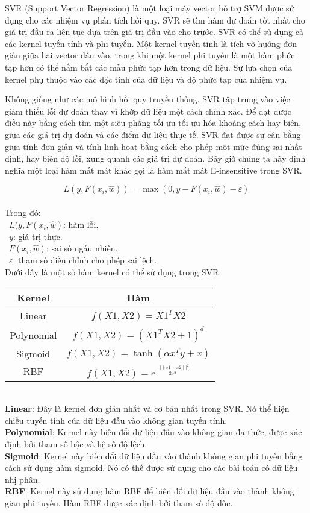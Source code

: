 SVR (Support Vector Regression) là một loại máy vector hỗ trợ SVM được sử dụng cho các nhiệm vụ phân tích hồi quy. SVR sẽ tìm hàm dự đoán tốt nhất cho giá trị đầu ra liên tục dựa trên giá trị đầu vào cho trước. SVR có thể sử dụng cả các kernel tuyến tính và phi tuyến. Một kernel tuyến tính là tích vô hướng đơn giản giữa hai vector đầu vào, trong khi một kernel phi tuyến là một hàm phức tạp hơn có thể nắm bắt các mẫu phức tạp hơn trong dữ liệu. Sự lựa chọn của kernel phụ thuộc vào các đặc tính của dữ liệu và độ phức tạp của nhiệm vụ.

Không giống như các mô hình hồi quy truyền thống, SVR tập trung vào việc giảm thiểu lỗi dự đoán thay vì khớp dữ liệu một cách chính xác. Để đạt được điều này bằng cách tìm một siêu phẳng tối ưu tối ưu hóa khoảng cách hay biên, giữa các giá trị dự đoán và các điểm dữ liệu thực tế. SVR đạt được sự cân bằng giữa tính đơn giản và tính linh hoạt bằng cách cho phép một mức đúng sai nhất định, hay biên độ lỗi, xung quanh các giá trị dự đoán. Bây giờ chúng ta hãy định nghĩa một loại hàm mất mát khác gọi là hàm mất mát E-insensitive trong SVR.

\[
L(y, F(x_i, \hat{w})) = \max(0, y - F(x_i, \hat{w}) - \varepsilon)
\]\\
Trong đó:\\
    \indent\textbullet\ \(L(y,F(x_i,\hat{w})\): hàm lỗi.\\
    \indent\textbullet\ \(y\): giá trị thực.\\
    \indent\textbullet\ \(F(x_i,\hat{w})\): sai số ngẫu nhiên.\\
    \indent\textbullet\ \(\varepsilon\): tham số điều chỉnh cho phép sai lệch.\\
Dưới đây là một số hàm kernel có thể sử dụng trong SVR
\begin{table}[htbp]
  \centering
\begin{tabular}{|c|c|}
    \hline
     Kernel& Hàm\\ \hline
     Linear &  $f(X1,X2)=X1^TX2$\\ \hline
     Polynomial & $f(X1,X2)=(X1^TX2 +1)^d$ \\ \hline
     Sigmoid &  $f(X1,X2)=\tanh(\alpha x^{T}y+x)$\\ \hline
     RBF &  $f(X1,X2)=e^{\frac{-{\mid\mid x1-x2 \mid\mid}^2}{2\sigma^2}}$\\ \hline
\end{tabular}
\end{table}\\
\textbf{Linear}: Đây là kernel đơn giản nhất và cơ bản nhất trong SVR. Nó thể hiện chiều tuyến tính của dữ liệu đầu vào không gian tuyến tính.\\
\textbf{Polynomial}: Kernel này biến đổi dữ liệu đầu vào không gian đa thức, được xác định bởi tham số bậc và hệ số độ lệch.\\
\textbf{Sigmoid}: Kernel này biến đổi dữ liệu đầu vào thành không gian phi tuyến bằng cách sử dụng hàm sigmoid. Nó có thể được sử dụng cho các bài toán có dữ liệu nhị phân.\\
\textbf{RBF}: Kernel này sử dụng hàm RBF để biến đổi dữ liệu đầu vào thành không gian phi tuyến. Hàm RBF được xác định bởi tham số độ dốc.\\
